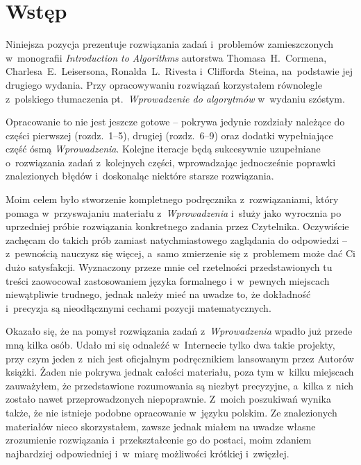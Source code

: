 \chapter{Wstęp}

Niniejsza pozycja prezentuje rozwiązania zadań i~problemów zamieszczonych w~monografii \textsl{Introduction to Algorithms} \cite{cormen} autorstwa Thomasa~H.~Cormena, Charlesa~E.~Leisersona, Ronalda~L.~Rivesta i~Clifforda~Steina, na~podstawie jej drugiego wydania. Przy opracowywaniu rozwiązań korzystałem równolegle z~polskiego tłumaczenia pt.~\textsl{Wprowadzenie do algorytmów} \cite{cormenpl} w~wydaniu szóstym.

Opracowanie to nie jest jeszcze gotowe -- pokrywa jedynie rozdziały należące do części pierwszej (rozdz.~1\nobreakdash--5), drugiej (rozdz.~6\nobreakdash--9) oraz dodatki wypełniające część ósmą \textsl{Wprowadzenia}. Kolejne iteracje będą sukcesywnie uzupełniane o~rozwiązania zadań z~kolejnych części, wprowadzając jednocześnie poprawki znalezionych błędów i~doskonaląc niektóre starsze rozwiązania.

Moim celem było stworzenie kompletnego podręcznika z~rozwiązaniami, który pomaga w~przyswajaniu materiału z~\textsl{Wprowadzenia} i~służy jako wyrocznia po uprzedniej próbie rozwiązania konkretnego zadania przez Czytelnika. Oczywiście zachęcam do takich prób zamiast natychmiastowego zaglądania do odpowiedzi -- z~pewnością nauczysz się więcej, a~samo zmierzenie się z~problemem może dać Ci dużo satysfakcji. Wyznaczony przeze mnie cel rzetelności przedstawionych tu treści zaowocował zastosowaniem języka formalnego i~w~pewnych miejscach niewątpliwie trudnego, jednak należy mieć na uwadze to, że dokładność i~precyzja są nieodłącznymi cechami pozycji matematycznych.

Okazało się, że na pomysł rozwiązania zadań z~\textsl{Wprowadzenia} wpadło już przede mną kilka osób. Udało mi się odnaleźć w~Internecie tylko dwa takie projekty, przy czym jeden z~nich jest oficjalnym podręcznikiem lansowanym przez Autorów książki. Żaden nie pokrywa jednak całości materiału, poza tym w~kilku miejscach zauważyłem, że przedstawione rozumowania są niezbyt precyzyjne, a~kilka z~nich zostało nawet przeprowadzonych niepoprawnie. Z~moich poszukiwań wynika także, że nie istnieje podobne opracowanie w~języku polskim. Ze znalezionych materiałów nieco skorzystałem, zawsze jednak miałem na uwadze własne zrozumienie rozwiązania i~przekształcenie go do postaci, moim zdaniem najbardziej odpowiedniej i~w~miarę możliwości krótkiej i~zwięzłej.

